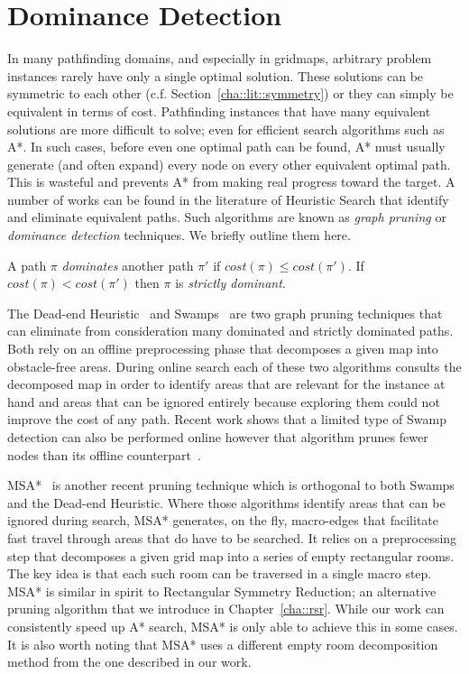 \section{Dominance Detection}
\label{cha::lit::dominance}
In many pathfinding domains, and especially in gridmaps, arbitrary problem
instances rarely have only a single optimal solution. These solutions can be
symmetric to each other (c.f. Section~\ref{cha::lit::symmetry}) or they can
simply be equivalent in terms of cost.  Pathfinding instances that have many
equivalent solutions are more difficult to solve; even for efficient search
algorithms such as A{*}. In such cases, before even one optimal path can be
found, A{*} must usually generate (and often expand) every node on every other
equivalent optimal path.  This is wasteful and prevents A{*} from making real
progress toward the target.  A number of works can be found in the literature
of Heuristic Search that identify and eliminate equivalent paths. Such
algorithms are known as \emph{graph pruning} or \emph{dominance detection}
techniques. We briefly outline them here.

\begin{definition}
A path $\pi$ \emph{dominates} another path $\pi'$ if $cost(\pi) \leq cost(\pi')$. 
If $cost(\pi) < cost(\pi')$ then $\pi$ is \emph{strictly dominant}.
\end{definition}

The Dead-end Heuristic~\citep{bjornsson06} and
Swamps~\citep{pochter09,pochter10} are two graph pruning techniques that can
eliminate from consideration many dominated and strictly dominated paths.
Both rely on an offline preprocessing phase that decomposes a given map into
obstacle-free areas.  During online search each of these two algorithms
consults the decomposed map in order to identify areas that are relevant for
the instance at hand and areas that can be ignored entirely because exploring
them could not improve the cost of any path. Recent work shows that a limited 
type of Swamp detection can also be performed online however that algorithm 
prunes fewer nodes than its offline counterpart~\cite{DBLP:conf/socs/SharonSF13}.

MSA{*}~\citep{bolanca09} is another recent pruning technique which is
orthogonal to both Swamps and the Dead-end Heuristic.  Where those algorithms
identify areas that can be ignored during search, MSA{*} generates, on the
fly, macro-edges that facilitate fast travel through areas that do have to be
searched.  It relies on a preprocessing step that decomposes a given grid map
into a series of empty rectangular rooms. The key idea is that each such room
can be traversed in a single macro step. MSA{*} is similar in spirit to
Rectangular Symmetry Reduction; an alternative pruning algorithm that we
introduce in Chapter~\ref{cha::rsr}.  While our work can consistently speed up
A{*} search, MSA{*} is only able to achieve this in some cases.  It is also
worth noting that MSA{*} uses a different empty room decomposition method from
the one described in our work.

